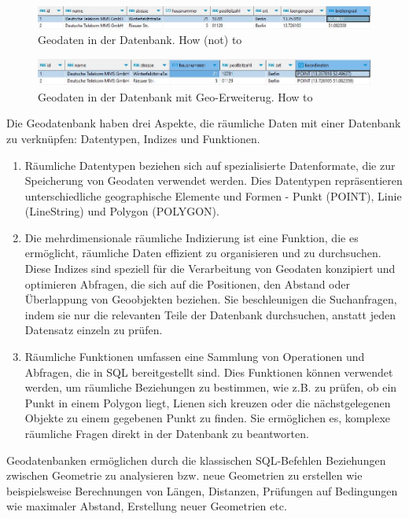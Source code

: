 \begin{figure}[ht]
  \centering
  \includegraphics[width=\linewidth]{images/einfacheDB.jpg}
  \caption{Geodaten in der Datenbank. How (not) to}
  \label{fig:meineabbildung}
\end{figure}
\begin{figure}[ht]
  \centering
  \includegraphics[width=\linewidth]{images/geoDB.jpg}
  \caption{Geodaten in der Datenbank mit Geo-Erweiterug. How to}
  \label{fig:meineabbildung}
\end{figure}
 Die Geodatenbank haben drei Aspekte, die räumliche Daten mit einer Datenbank zu verknüpfen: Datentypen, Indizes und Funktionen.
\begin{enumerate}
    \item Räumliche Datentypen beziehen sich auf spezialisierte Datenformate, die zur Speicherung von Geodaten verwendet werden. Dies Datentypen repräsentieren unterschiedliche geographische Elemente und Formen - Punkt (POINT), Linie (LineString) und Polygon (POLYGON).
    \item Die mehrdimensionale räumliche Indizierung ist eine Funktion, die es ermöglicht, räumliche Daten effizient zu organisieren und zu durchsuchen. Diese Indizes sind speziell für die Verarbeitung von Geodaten konzipiert und optimieren Abfragen, die sich auf die Positionen, den Abstand oder Überlappung von Geoobjekten beziehen. Sie beschleunigen die Suchanfragen, indem sie nur die relevanten Teile der Datenbank durchsuchen, anstatt jeden Datensatz einzeln zu prüfen.
    \item Räumliche Funktionen umfassen eine Sammlung von Operationen und Abfragen, die in SQL bereitgestellt sind. Dies Funktionen können verwendet werden, um räumliche Beziehungen zu bestimmen, wie z.B. zu prüfen, ob ein Punkt in einem Polygon liegt, Lienen sich kreuzen oder die nächstgelegenen Objekte zu einem gegebenen Punkt zu finden. Sie ermöglichen es, komplexe räumliche Fragen direkt in der Datenbank zu beantworten. 
\end{enumerate}

Geodatenbanken ermöglichen durch die klassischen SQL-Befehlen Beziehungen zwischen Geometrie zu analysieren bzw. neue Geometrien zu erstellen wie beispielsweise Berechnungen von Längen, Distanzen, Prüfungen auf Bedingungen wie maximaler Abstand, Erstellung neuer Geometrien etc.
